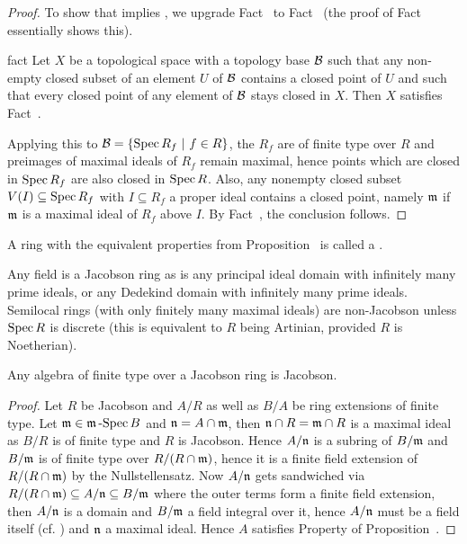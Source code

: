 \documentclass[a4paper,parskip=half,numbers=enddot, DIV=12]{scrreprt}
\begin{document}
\begin{proof}
    To show that  implies , we upgrade Fact~ to Fact~ (the proof of Fact~ essentially shows this).
    
    \begin{varthm}[$^{++}$]{fact}
        Let $X$ be a topological space with a topology base $\mathcal{B}$ such that any non-empty closed subset of an element $U$ of $\mathcal{B}$ contains a closed point of $U$ and such that every closed point of any  element of $\mathcal{B}$ stays closed in $X$. Then $X$ satisfies Fact~.
    \end{varthm}
    
    Applying this to $\mathcal{B} = \left\{\operatorname{Spec} R_f \ \middle|\  f\in R\right\}$, the $R_f$ are of finite type over $R$ and preimages of maximal ideals of $R_f$ remain maximal, hence points which are closed in $\operatorname{Spec} R_f$ are also closed in $\operatorname{Spec} R$. Also, any nonempty closed subset $V(I)\subseteq \operatorname{Spec} R_f$ with $I\subseteq R_f$ a proper ideal contains a closed point, namely $\mathfrak{m}$ if $\mathfrak{m}$ is a maximal ideal of $R_f$ above $I$. By Fact~, the conclusion follows. 
\end{proof}
\begin{defi}
    A ring with the equivalent properties from Proposition~ is called a .
\end{defi}
\begin{example}
    Any field is a Jacobson ring as is any principal ideal domain with infinitely many prime ideals, or any Dedekind domain with infinitely many prime ideals. Semilocal rings (with only finitely many maximal ideals) are non-Jacobson unless $\operatorname{Spec} R$ is discrete (this is equivalent to $R$ being Artinian, provided $R$ is Noetherian).
\end{example}
\begin{cor}
    Any algebra of finite type over a Jacobson ring is Jacobson.
\end{cor}
\begin{proof}
    Let $R$ be Jacobson and $A/R$ as well as $B/A$ be ring extensions of finite type. Let $\mathfrak{m}\in \mathfrak{m}\operatorname{-Spec} B$ and $\mathfrak{n} = A\cap \mathfrak{m}$, then $\mathfrak{n}\cap R = \mathfrak{m}\cap R$ is a maximal ideal as $B/R$ is of finite type and $R$ is Jacobson. Hence $A/\mathfrak{n}$ is a subring of $B/\mathfrak{m}$ and $B/\mathfrak{m}$ is of finite type over $R/(R\cap\mathfrak{m})$, hence it is a finite field extension of $R/(R\cap\mathfrak{m})$ by the Nullstellensatz. Now $A/\mathfrak{n}$ gets sandwiched via $R/(R\cap\mathfrak{m}) \subseteq A/\mathfrak{n} \subseteq B/\mathfrak{m}$ where the outer terms form a finite field extension, then $A/\mathfrak{n}$ is a domain and $B/\mathfrak{m}$ a field integral over it, hence $A/\mathfrak{n}$ must be a field itself (cf. \cite[Proposition~1.5.1]{alg1}) and $\mathfrak{n}$ a maximal ideal. Hence $A$ satisfies Property  of Proposition~.
\end{proof}
\end{document}
